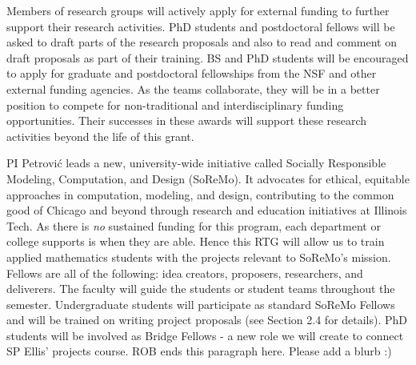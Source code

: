 \documentclass[11pt]{NSFamsart}
\begin{document}
Members of research groups will actively apply for external funding to further support their research activities.  PhD students and postdoctoral fellows will be asked to draft parts of the research proposals and also to read and comment on draft proposals as part of their training.  BS and PhD students will be encouraged to apply for graduate and postdoctoral fellowships from the NSF and other external funding agencies.  As the teams collaborate, they will be in a better position to compete for  non-traditional and interdisciplinary funding opportunities.  Their successes in these awards will support these research activities beyond the life of this grant.

PI  Petrovi\'c  leads a new, university-wide initiative called Socially Responsible Modeling, Computation, and Design (SoReMo).  It advocates for ethical, equitable approaches in computation, modeling, and design, contributing to the common good of Chicago and beyond through research and education initiatives at Illinois Tech. As there is \emph{no} sustained funding for this program, each department or college supports is when they are able. Hence this RTG will allow us to  train applied mathematics students with the projects relevant to SoReMo's mission.  Fellows are all of the following: idea creators, proposers, researchers, and deliverers. The faculty will guide the students or student teams throughout the semester. Undergraduate students will participate as standard SoReMo Fellows and will be trained on writing project proposals (see Section 2.4 for details). PhD students will be involved as Bridge Fellows - a new role we will create to connect SP Ellis' projects course. {\color{magenta}ROB ends this paragraph here. Please add a blurb :) } 


\end{document}

